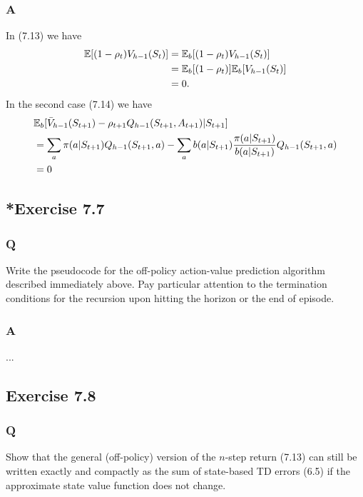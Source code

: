 \subsubsection*{A}
In (7.13) we have
\begin{align*}
    \mathbb{E}{}[(1-\rho_t)V_{h-1}(S_t)] &= \mathbb{E}{}_b[(1-\rho_t)V_{h-1}(S_t)] \\
                                 &= \mathbb{E}{}_b[(1-\rho_t)]\mathbb{E}{}_b[V_{h-1}(S_t)] \\
                                 &= 0.
\end{align*}
In the second case (7.14) we have 
\begin{align*}
    & \mathbb{E}{}_b [\bar{V}_{h-1}(S_{t+1}) - \rho_{t+1}Q_{h-1}(S_{t+1}, A_{t+1}) \vert S_{t+1}] \\
    &= \sum_a \pi(a \vert S_{t+1}) Q_{h-1}(S_{t+1}, a) - \sum_a b(a \vert S_{t+1}) \frac{\pi(a\vert S_{t+1})}{b(a \vert S_{t+1})} Q_{h-1}(S_{t+1}, a)\\
                        &= 0 
\end{align*}

\subsection{*Exercise 7.7}
\subsubsection*{Q}
Write the pseudocode for the off-policy action-value prediction algorithm described immediately above. Pay particular attention to the termination conditions for the recursion upon hitting the horizon or the end of episode.
\subsubsection*{A}
...

\subsection{Exercise 7.8}
\subsubsection*{Q}
Show that the general (off-policy) version of the $n$-step return (7.13) can still be written exactly and compactly as the sum of state-based TD errors (6.5) if the approximate state value function does not change.
